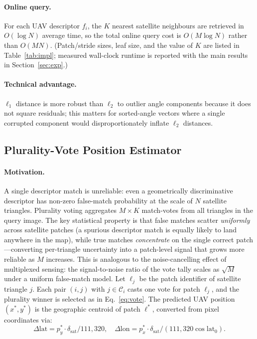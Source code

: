 \documentclass[10pt]{article}
\theoremstyle{plain}
\theoremstyle{definition}
\begin{document}
\paragraph{Online query.}
For each UAV descriptor $f_i$, the $K$ nearest satellite neighbours are
retrieved in $O(\log N)$ average time, so the total online query cost is
$O(M\log N)$ rather than $O(MN)$. (Patch/stride sizes, leaf size, and the value
of $K$ are listed in Table~\ref{tab:impl}; measured wall-clock runtime is
reported with the main results in Section~\ref{sec:exp}.)

\paragraph{Technical advantage.}
$\ell_1$ distance is more robust than $\ell_2$ to outlier angle components because it
does not square residuals; this matters for sorted-angle vectors where a
single corrupted component would disproportionately inflate $\ell_2$ distances.

\subsection{Plurality-Vote Position Estimator}
\label{sec:vote}

\paragraph{Motivation.}
A single descriptor match is unreliable: even a geometrically discriminative
descriptor has non-zero false-match probability at the scale of $N$ satellite
triangles.
Plurality voting aggregates $M \times K$ match-votes from all triangles in the
query image.
The key statistical property is that false matches scatter \emph{uniformly}
across satellite patches (a spurious descriptor match is equally likely to land
anywhere in the map), while true matches \emph{concentrate} on the single
correct patch---converting per-triangle uncertainty into a patch-level signal
that grows more reliable as $M$ increases.
This is analogous to the noise-cancelling effect of multiplexed sensing: the
signal-to-noise ratio of the vote tally scales as $\sqrt{M}$ under a uniform
false-match model.
Let $\ell_j$ be the patch identifier of satellite triangle $j$.
Each pair $(i,j)$ with $j \in \mathcal{C}_i$ casts one vote for patch
$\ell_j$, and the plurality winner is selected as in Eq.~\eqref{eq:vote}.
The predicted UAV position $(x^*,y^*)$ is the geographic centroid of
patch $\ell^*$, converted from pixel coordinates via:
\begin{equation}
\Delta\mathrm{lat} = p_y^* \cdot \delta_{\mathrm{sat}} / 111{,}320,\quad
\Delta\mathrm{lon} = p_x^* \cdot \delta_{\mathrm{sat}} /
  (111{,}320\cos\mathrm{lat}_0).
\label{eq:geoconvert}
\end{equation}
\end{document}
